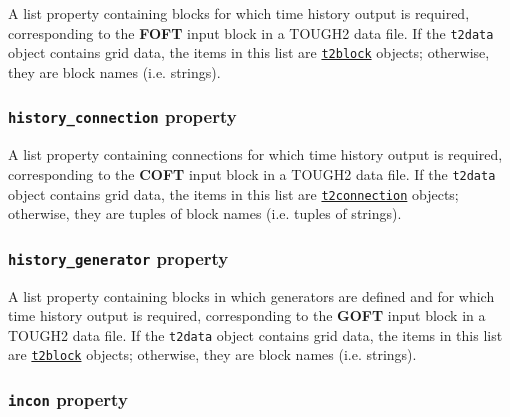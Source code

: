 A list property containing blocks for which time history output is required, corresponding to the \textbf{FOFT} input block in a TOUGH2 data file.  If the \texttt{t2data} object contains grid data, the items in this list are \hyperref[t2blockobjects]{\texttt{t2block}} objects; otherwise, they are block names (i.e. strings).

\begin{snugshade}
\subsubsection{\texttt{history\_connection} property}
\end{snugshade}
\label{sec:t2data:history_connection}

A list property containing connections for which time history output is required, corresponding to the \textbf{COFT} input block in a TOUGH2 data file.  If the \texttt{t2data} object contains grid data, the items in this list are \hyperref[t2connectionobjects]{\texttt{t2connection}} objects; otherwise, they are tuples of block names (i.e. tuples of strings).

\begin{snugshade}
\subsubsection{\texttt{history\_generator} property}
\end{snugshade}
\label{sec:t2data:history_generator}

A list property containing blocks in which generators are defined and for which time history output is required, corresponding to the \textbf{GOFT} input block in a TOUGH2 data file.  If the \texttt{t2data} object contains grid data, the items in this list are \hyperref[t2blockobjects]{\texttt{t2block}} objects; otherwise, they are block names (i.e. strings).

\begin{snugshade}
\subsubsection{\texttt{incon} property}
\end{snugshade}
\label{sec:t2data:incon}

